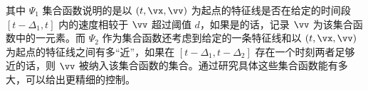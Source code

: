 其中 $\Psi_1$ 集合函数说明的是以 $(t,\vx, \vv)$ 为起点的特征线是否在给定的时间段 $[t-\Delta_1, t]$ 内的速度相较于 $\vv$ 超过阈值 $d$，如果是的话，记录 $\vv$ 为该集合函数中的一元素。而 $\Psi_2$ 作为集合函数还考虑到给定的一条特征线和以 $(t,\vx, \vv)$ 为起点的特征线之间有多“近”，如果在 $[t-\Delta_1, t-\Delta_2]$ 存在一个时刻两者足够近的话，则 $\vv$ 被纳入该集合函数的集合。通过研究具体这些集合函数能有多大，可以给出更精细的控制。



